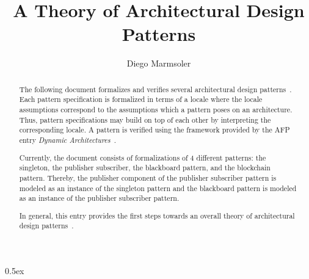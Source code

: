 \documentclass[11pt,a4paper]{article}
\begin{document}
\title{A Theory of Architectural Design Patterns}
\author{Diego Marmsoler}
\maketitle

\begin{abstract}
	The following document formalizes and verifies several architectural design patterns~\cite{Buschmann1996}.
	Each pattern specification is formalized in terms of a locale where the locale assumptions correspond to the assumptions which a pattern poses on an architecture.
	Thus, pattern specifications may build on top of each other by interpreting the corresponding locale.
	A pattern is verified using the framework provided by the AFP entry \textit{Dynamic Architectures}~\cite{Marmsoler2017d}.
	
	Currently, the document consists of formalizations of $4$ different patterns:
	the singleton, the publisher subscriber, the blackboard pattern, and the blockchain pattern.
	Thereby, the publisher component of the publisher subscriber pattern is modeled as an instance of the singleton pattern and the blackboard pattern is modeled as an instance of the publisher subscriber pattern.
	
	In general, this entry provides the first steps towards an overall theory of architectural design patterns~\cite{Marmsoler2014}.
\end{abstract}
\tableofcontents

\parindent 0pt\parskip 0.5ex





\end{document}

